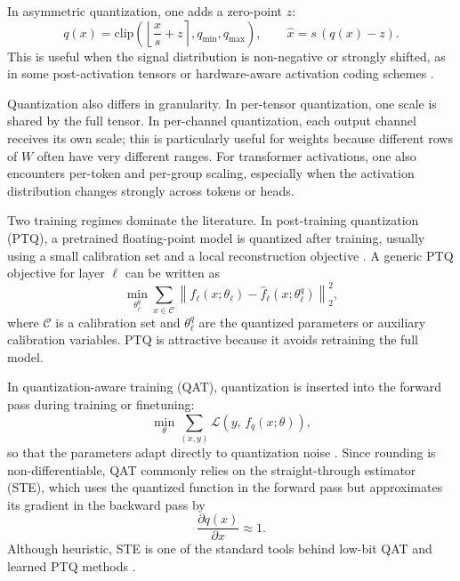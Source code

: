 \documentclass[a4paper,11pt,oneside]{article}
\theoremstyle{breakstyle}
\begin{document}
In asymmetric quantization, one adds a zero-point $z$:
\begin{equation}
q(x)
=
\mathrm{clip}
\!\left(
\left\lfloor \frac{x}{s} + z \right\rceil,
q_{\min}, q_{\max}
\right),
\qquad
\hat{x}
=
s\,(q(x)-z).
\label{eq:asymmetric_quant_background}
\end{equation}
This is useful when the signal distribution is non-negative or strongly
shifted, as in some post-activation tensors or hardware-aware activation
coding schemes \cite{Jacob2018IntegerOnly,Wu2020IntegerQuant}.

Quantization also differs in granularity. In per-tensor
quantization, one scale is shared by the full tensor. In
per-channel quantization, each output channel receives its own
scale; this is particularly useful for weights because different rows of
$W$ often have very different ranges. For transformer activations, one
also encounters per-token and per-group scaling, especially when the
activation distribution changes strongly across tokens or heads.

Two training regimes dominate the literature. In
post-training quantization (PTQ), a pretrained floating-point
model is quantized after training, usually using a small calibration set
and a local reconstruction objective
\cite{ZeroQuant2022,AWQ2023,OmniQuant2023,CBQ2023,FlatQuant2024,QEP2025}.
A generic PTQ objective for layer $\ell$ can be written as
\begin{equation}
\min_{\theta_\ell^q}
\sum_{x \in \mathcal{C}}
\left\|
f_\ell(x;\theta_\ell)
-
\hat{f}_\ell(x;\theta_\ell^q)
\right\|_2^2,
\label{eq:ptq_objective_background}
\end{equation}
where $\mathcal{C}$ is a calibration set and $\theta_\ell^q$ are the
quantized parameters or auxiliary calibration variables. PTQ is
attractive because it avoids retraining the full model.

In quantization-aware training (QAT), quantization is inserted
into the forward pass during training or finetuning:
\begin{equation}
\min_{\theta}
\sum_{(x,y)}
\mathcal{L}
\!\left(
y,\,
f_q(x;\theta)
\right),
\label{eq:qat_objective_background}
\end{equation}
so that the parameters adapt directly to quantization noise
\cite{PACT2018,LSQ2019,LLMQAT2023,EfficientQAT2024}. Since rounding is
non-differentiable, QAT commonly relies on the straight-through
estimator (STE), which uses the quantized function in the forward pass
but approximates its gradient in the backward pass by
\begin{equation}
\frac{\partial q(x)}{\partial x} \approx 1.
\label{eq:ste_background}
\end{equation}
Although heuristic, STE is one of the standard tools behind low-bit QAT
and learned PTQ methods \cite{PACT2018,LSQ2019}.
\end{document}
